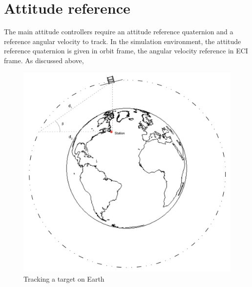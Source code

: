 \section{Attitude reference}

The main attitude controllers require an attitude reference quaternion and a reference angular velocity to track. In the simulation environment, the attitude reference quaternion is given in orbit frame, the angular velocity reference in ECI frame. As discussed above,

%
%
%

\begin{figure}[H]
	\centering
	\includegraphics[width=0.6\linewidth]{figures/TS}
	\caption{Tracking a target on Earth }
	\label{fig:TS}
\end{figure}

